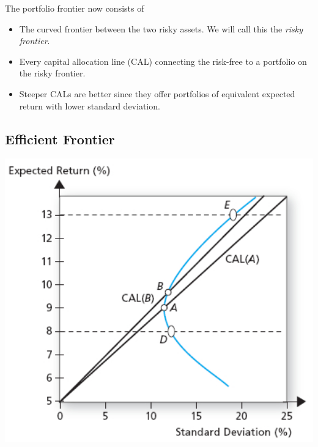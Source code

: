 \documentclass[letterpaper,10pt,english]{sphinxmanual}
\begin{document}
The portfolio frontier now consists of
\begin{itemize}
\item {} 
The curved frontier between the two risky assets. We will call this
the \emph{risky frontier}.

\end{itemize}
\begin{itemize}
\item {} 
Every capital allocation line (CAL) connecting the risk-free to a
portfolio on the risky frontier.

\end{itemize}
\begin{itemize}
\item {} 
Steeper CALs are better since they offer portfolios of equivalent
expected return with lower standard deviation.

\end{itemize}


\subsection{Efficient Frontier}
\label{portfolioOpt:efficient-frontier}
\includegraphics[width=6in]{pg206_1.jpg}
\end{document}
